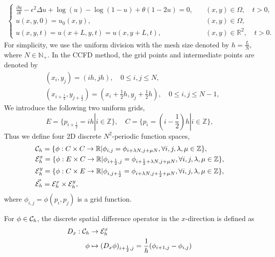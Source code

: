 \begin{align}
\begin{cases}
    \frac{\partial u}{\partial t}-\epsilon^2\Delta u+\log(u)-\log(1-u)+\theta(1-2u)=0,\quad &(x,y)\in \Omega,\quad t>0,\\
    u(x,y,0)=u_0(x,y),&(x,y)\in\Omega,\\
    u(x,y,t)=u(x+L,y,t)=u(x,y+L,t),\quad &(x,y)\in \mathbb{R}^2,\quad t>0.
\end{cases}
\end{align}
For simplicity, we use the uniform division with the mesh size denoted by $h=\frac{L}{N}$, where $N\in \mathbb{N}_{+}$. In the CCFD method, the grid points and intermediate points are denoted by
\begin{subequations}
    \begin{align}
    &(x_i,y_j)=(ih,jh),\quad 0\leq i,j\leq N,\\
    &(x_{i+\frac{1}{2}},y_{j+\frac{1}{2}})=(x_i+\frac{1}{2}h,y_j+\frac{1}{2}h),\quad 0\leq i,j\leq N-1,
\end{align}
\end{subequations}
We introduce the following two uniform grids,
\begin{equation}
    E=\{p_{i+\frac{1}{2}}=ih|i\in \mathbb{Z}\},
    \quad C=\{p_{i}=(i-\frac{1}{2})h|i\in \mathbb{Z}\},
\end{equation}
Thus we define four $2$D discrete $N^2$-periodic function spaces,
\begin{subequations}
    \begin{align}
    &{\mathcal{C}_h}=\{\phi:C\times C\rightarrow \mathbb{R}|\phi_{i,j}=\phi_{i+\lambda N,j+\mu N},\forall i,j,\lambda, \mu\in\mathbb{Z}\},\\
    &{\mathcal{E}^x_h}=\{\phi:E\times C\rightarrow \mathbb{R}|\phi_{i+\frac{1}{2},j}=\phi_{i+\frac{1}{2}+\lambda N,j+\mu N},\forall i,j,\lambda, \mu\in\mathbb{Z}\},\\
    &{\mathcal{E}^y_h}=\{\phi:C\times E\rightarrow \mathbb{R}|\phi_{i,j+\frac{1}{2}}=\phi_{i+\lambda N,j+\frac{1}{2}+\mu N},\forall i,j,\lambda, \mu\in\mathbb{Z}\},\\
    &{\vec{\mathcal{E}_h}}={\mathcal{E}^x_h}\times {\mathcal{E}^y_h},
\end{align} 
\end{subequations}
where $\phi_{i,j}=\phi(p_i,p_j)$ is a grid function.
\par For $\phi \in {\mathcal{C}_h}$, the discrete spatial difference operator in the $x$-direction is defined as
\begin{equation}
    \begin{aligned}
        D_x:{\mathcal{C}_h}&\rightarrow{\mathcal{E}^x_h}\\
        \phi&\mapsto(D_x \phi)_{i+\frac{1}{2},j}=\frac{1}{h}(\phi_{i+1,j}-\phi_{i,j})
    \end{aligned}
\end{equation}
    

